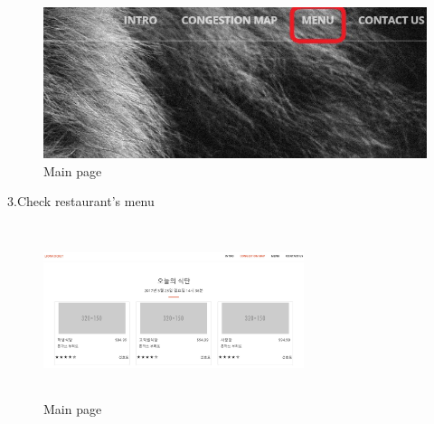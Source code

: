 \documentclass[journal]{IEEEtran}
\begin{document}
\begin{figure}[h]
\centering
\includegraphics[scale=0.3]{E1.jpg}
\caption{Main page}
\label{fig:congestion button}
\end{figure}

\newline
3.Check restaurant’s menu
\newline\newline\newline\newline\newline\newline\newline
\newline\newline\newline\newline\newline\newline\newline\newline
\newline\newline\newline\newline\newline\newline\newline

\begin{figure}[h]
\centering
\includegraphics[width=3in,height=2in]{E2.jpg}
\caption{Main page}
\label{fig:congestion button}
\end{figure}
\end{document}
